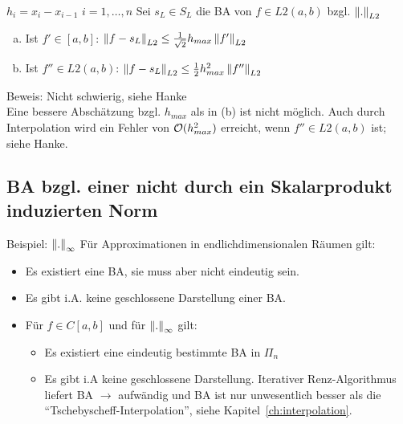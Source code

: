 $h_i = x_i - x_{i-1}\,\,i=1,\ldots,n$
 Sei $s_L \in S_L$ die BA von $f \in L2(a,b)$ bzgl. $\left\lVert . \right\rVert_{L2}$
\begin{enumerate}[(a)]
  \item Ist $f' \in [a,b]$: $\left\lVert f-s_L \right\rVert_{L2} \leq \frac{1}{\sqrt{2}} h_{max} \left\lVert f' \right\rVert_{L2}$
  \item Ist $f'' \in L2(a,b)$: $\left\lVert f-s_L \right\rVert_{L2} \leq \frac{1}{2} h^2_{max} \left\lVert f'' \right\rVert_{L2}$
\end{enumerate}
Beweis: Nicht schwierig, siehe Hanke\\
Eine bessere Abschätzung bzgl. $h_{max}$ als in (b) ist nicht möglich.
Auch durch Interpolation wird ein Fehler von $\mathcal{O}(h^2_{max})$ erreicht,
wenn $f'' \in L2(a,b)$ ist; siehe Hanke.

\subsection{BA bzgl. einer nicht durch ein Skalarprodukt induzierten Norm}
Beispiel: $\left\lVert . \right\rVert_\infty$
Für Approximationen in endlichdimensionalen Räumen gilt:
\begin{itemize}
  \item Es existiert eine BA, sie muss aber nicht eindeutig sein.
  \item Es gibt i.A. keine geschlossene Darstellung einer BA.
  \item Für $f \in C[a,b]$ und für $\left\lVert . \right\rVert_\infty$ gilt:
    \begin{itemize}
      \item Es existiert eine eindeutig bestimmte BA in $\Pi_n$
      \item Es gibt i.A keine geschlossene Darstellung. Iterativer Renz-Algorithmus liefert BA
        $\rightarrow$ aufwändig und BA ist nur unwesentlich besser als die ``Tschebyscheff-Interpolation'',
        siehe Kapitel~\ref{ch:interpolation}.
    \end{itemize}
\end{itemize}

